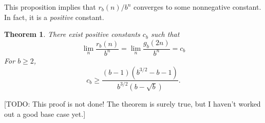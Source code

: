 \documentclass[12pt]{amsart}
\newtheorem{theorem}{Theorem}
\theoremstyle{definition}
\begin{document}
This proposition implies that $r_b(n) / b^n$ converges to some nonnegative
constant. In fact, it is a \emph{positive} constant.

\begin{theorem}
    There exist positive constants $c_b$ such that
    \begin{equation*}
        \lim_n \frac{r_b(n)}{b^n} = \lim_n \frac{g_b(2n)}{b^n} = c_b
    \end{equation*}
    For $b \geq 2$,
    \begin{equation*}
        c_b \geq \frac{(b - 1) (b^{3 / 2} - b - 1)}{b^{3 / 2} (b - \sqrt{b})}.
    \end{equation*}
\end{theorem}

[TODO: This proof is not done! The theorem is surely true, but I haven't worked
out a good base case yet.]
\end{document}
